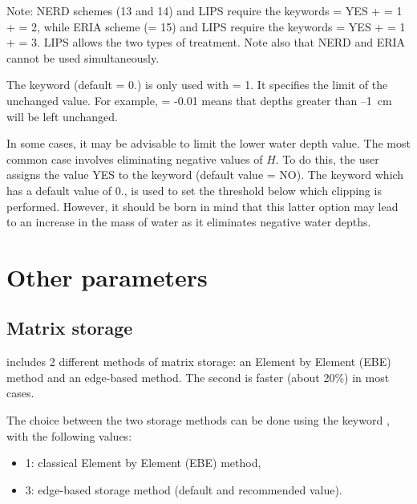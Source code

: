 \begin{WarningBlock}{Note:}
NERD schemes (13 and 14) and LIPS require the keywords
   = YES
+  = 1
+  = 2,
while ERIA scheme (= 15) and LIPS require the keywords
   = YES
+  = 1
+  = 3.
LIPS allows the two types of treatment.
Note also that NERD and ERIA cannot be used simultaneously.
\end{WarningBlock}

The keyword  (default = 0.)
is only used with  = 1.
It specifies the limit of the unchanged value.
For example,  = -0.01 means
that depths greater than --1~cm will be left unchanged.

In some cases, it may be advisable to limit the lower water depth value.
The most common case involves eliminating negative values of $H$.
To do this, the user assigns the value YES to the keyword 
(default value = NO).
The keyword  which has a default value of 0.,
is used to set the threshold below which clipping is performed.
However, it should be born in mind that this latter option may lead
to an increase in the mass of water as it eliminates negative water depths.

\section{Other parameters}

\subsection{Matrix storage}

 includes 2 different methods of matrix storage:
an Element by Element (EBE) method and an edge-based method.
The second is faster (about 20\%) in most cases.

The choice between the two storage methods can be done using the keyword
, with the following values:

\begin{itemize}
\item 1: classical Element by Element (EBE) method,

\item 3: edge-based storage method (default and recommended value).
\end{itemize}

